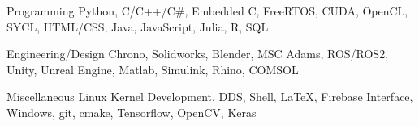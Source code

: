 

\begin{cvskills}

  \cvskill
    {Programming} %
    {Python, C/C++/C\#, Embedded C, FreeRTOS, CUDA, OpenCL, SYCL, HTML/CSS, Java, JavaScript, Julia, R, SQL} %

\cvskill
{Engineering/Design} %
{Chrono, Solidworks, Blender, MSC Adams, ROS/ROS2, Unity, Unreal Engine, Matlab, Simulink, Rhino, COMSOL} %

  \cvskill
    {Miscellaneous} %
    {Linux Kernel Development, DDS, Shell, LaTeX, Firebase Interface, Windows, git, cmake, Tensorflow, OpenCV, Keras} %
   


\end{cvskills}

